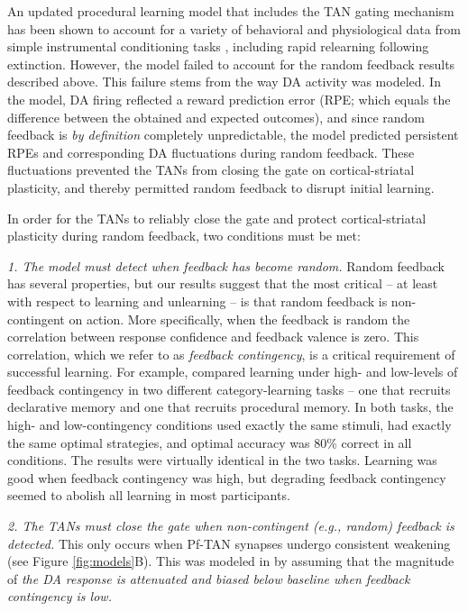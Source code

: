 \documentclass[man,apacite,draftfirst]{apa6} \usepackage{amsmath}
\begin{document}
An updated procedural learning model that includes the TAN gating mechanism has
been shown to account for a variety of behavioral and physiological data from
simple instrumental conditioning tasks \cite{ashby_computational_2011,
crossley_expanding_2016}, including rapid relearning following extinction.
However, the model failed to account for the random feedback results described
above. This failure stems from the way DA activity was modeled. In the model, DA
firing reflected a reward prediction error (RPE; which equals the difference
between the obtained and expected outcomes), and since random feedback is
\emph{by definition} completely unpredictable, the model predicted persistent
RPEs and corresponding DA fluctuations during random feedback. These
fluctuations prevented the TANs from closing the gate on cortical-striatal
plasticity, and thereby permitted random feedback to disrupt initial learning.

In order for the TANs to reliably close the gate and protect cortical-striatal
plasticity during random feedback, two conditions must be met:

\begin{description}
\item \textit{1. The model must detect when feedback has become random.} Random
feedback has several properties, but our results suggest that the most critical
-- at least with respect to learning and unlearning -- is that random feedback
is non-contingent on action. More specifically, when the feedback is random the
correlation between response confidence and feedback valence is zero. This
correlation, which we refer to as \textit{feedback contingency}, is a critical
requirement of successful learning. For example, 
compared learning under high- and low-levels of feedback contingency in two
different category-learning tasks -- one that recruits declarative memory and
one that recruits procedural memory. In both tasks, the high- and
low-contingency conditions used exactly the same stimuli, had exactly the same
optimal strategies, and optimal accuracy was 80\% correct in all conditions. The
results were virtually identical in the two tasks. Learning was good when
feedback contingency was high, but degrading feedback contingency seemed to
abolish all learning in most participants.

\item \textit{2. The TANs must close the gate when non-contingent (e.g., random)
feedback is detected.} This only occurs when Pf-TAN synapses undergo consistent
weakening (see Figure \ref{fig:models}B). This was modeled in
\cite{crossley_erasing_2013} by assuming that the magnitude of \textit{the DA
response is attenuated and biased below baseline when feedback contingency is
low.}
\end{description}
\end{document}
